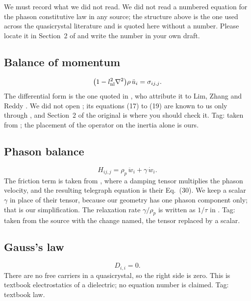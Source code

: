 \documentclass[11pt,a4paper]{article}
\begin{document}
We must record what we did not read. We did not read a numbered equation for the phason constitutive law in
any source; the structure above is the one used across the quasicrystal literature and is quoted here
without a number. Please locate it in Section~2 of \cite{Zhang2021} and write the number in your own draft.

\subsection{Balance of momentum}

\begin{equation}\label{eq:mom}
\bigl(1-l_{\rm nl}^2\nabla^2\bigr)\rho\,\ddot u_i=\sigma_{ij,j}.
\end{equation}
The differential form is the one quoted in \cite[Eqs.~(18)--(19)]{Barretta2018}, who attribute it to Lim,
Zhang and Reddy \cite{Lim2015}. We did not open \cite{Lim2015}; its equations (17) to (19) are known to us
only through \cite{Barretta2018}, and Section~2 of the original is where you should check it.
Tag: taken from \cite{Barretta2018}; the placement of the operator on the inertia alone is ours.

\subsection{Phason balance}

\begin{equation}\label{eq:phason}
H_{ij,j}=\rho_p\,\ddot w_i+\gamma\,\dot w_i .
\end{equation}
The friction term is taken from \cite[Eq.~(26)]{Agiasofitou2014}, where a damping tensor multiplies the
phason velocity, and the resulting telegraph equation is their Eq.~(30). We keep a scalar $\gamma$ in place
of their tensor, because our geometry has one phason component only; that is our simplification. The
relaxation rate $\gamma/\rho_p$ is written as $1/\tau$ in \cite[Eq.~(17)]{Baggioli2020}.
Tag: taken from the source with the change named, the tensor replaced by a scalar.

\subsection{Gauss's law}

\begin{equation}\label{eq:gauss}
D_{i,i}=0 .
\end{equation}
There are no free carriers in a quasicrystal, so the right side is zero. This is textbook electrostatics of
a dielectric; no equation number is claimed.
Tag: textbook law.
\end{document}
